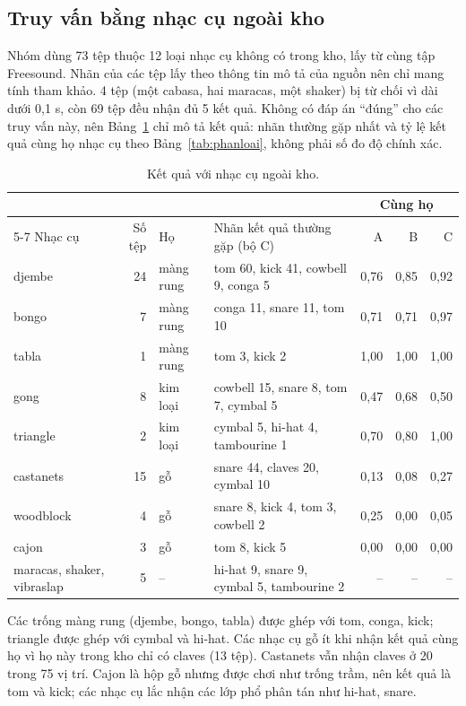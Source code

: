 \documentclass[11pt,a4paper]{article}
\begin{document}
\subsection{Truy vấn bằng nhạc cụ ngoài kho}\label{sec:ngoaikho}
Nhóm dùng 73 tệp thuộc 12 loại nhạc cụ không có trong kho, lấy từ cùng tập Freesound. Nhãn của các tệp lấy theo thông tin mô tả của nguồn nên chỉ mang tính tham khảo. 4 tệp (một cabasa, hai maracas, một shaker) bị từ chối vì dài dưới 0,1 s, còn 69 tệp đều nhận đủ 5 kết quả. Không có đáp án ``đúng'' cho các truy vấn này, nên Bảng~\ref{tab:ngoaikho} chỉ mô tả kết quả: nhãn thường gặp nhất và tỷ lệ kết quả cùng họ nhạc cụ theo Bảng~\ref{tab:phanloai}, không phải số đo độ chính xác.
\begin{table}[htbp]
\centering\small
\caption{Kết quả với nhạc cụ ngoài kho.}\label{tab:ngoaikho}
\begin{tabularx}{\textwidth}{lrlXrrr}
\toprule
& & & & \multicolumn{3}{c}{Cùng họ}\\\cmidrule(lr){5-7}
Nhạc cụ & Số tệp & Họ & Nhãn kết quả thường gặp (bộ C) & A & B & C\\\midrule
djembe & 24 & màng rung & tom 60, kick 41, cowbell 9, conga 5 & 0,76 & 0,85 & 0,92\\
bongo & 7 & màng rung & conga 11, snare 11, tom 10 & 0,71 & 0,71 & 0,97\\
tabla & 1 & màng rung & tom 3, kick 2 & 1,00 & 1,00 & 1,00\\
gong & 8 & kim loại & cowbell 15, snare 8, tom 7, cymbal 5 & 0,47 & 0,68 & 0,50\\
triangle & 2 & kim loại & cymbal 5, hi-hat 4, tambourine 1 & 0,70 & 0,80 & 1,00\\
castanets & 15 & gỗ & snare 44, claves 20, cymbal 10 & 0,13 & 0,08 & 0,27\\
woodblock & 4 & gỗ & snare 8, kick 4, tom 3, cowbell 2 & 0,25 & 0,00 & 0,05\\
cajon & 3 & gỗ & tom 8, kick 5 & 0,00 & 0,00 & 0,00\\
maracas, shaker, vibraslap & 5 & -- & hi-hat 9, snare 9, cymbal 5, tambourine 2 & -- & -- & --\\\bottomrule
\end{tabularx}
\end{table}
Các trống màng rung (djembe, bongo, tabla) được ghép với tom, conga, kick; triangle được ghép với cymbal và hi-hat. Các nhạc cụ gỗ ít khi nhận kết quả cùng họ vì họ này trong kho chỉ có claves (13 tệp). Castanets vẫn nhận claves ở 20 trong 75 vị trí. Cajon là hộp gỗ nhưng được chơi như trống trầm, nên kết quả là tom và kick; các nhạc cụ lắc nhận các lớp phổ phân tán như hi-hat, snare.
\end{document}
